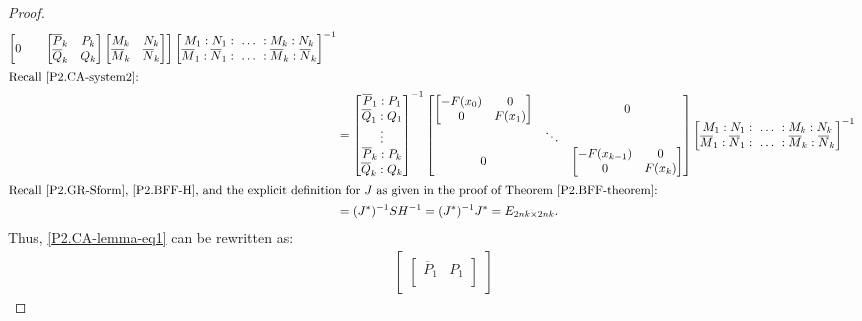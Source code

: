 \documentclass[10pt,reqno,oneside,a4paper]{article}
\begin{document}
\begin{proof}
\begin{align}
\begin{bmatrix}
0 & & \begin{bmatrix}
\overline{P}_k & P_k \\
\overline{Q}_k & Q_k 
\end{bmatrix} 
\begin{bmatrix}
M_k & N_k  \\
\overline{M}_k & \overline{N}_k 
\end{bmatrix}
\end{bmatrix}
\begin{bmatrix}
M_1 : N_1 :~ \ldots ~: M_k : N_k \\
\overline{M}_1 : \overline{N}_1 :~ \ldots ~: \overline{M}_k : \overline{N}_k 
\end{bmatrix}^{-1} \nonumber \\
\intertext{Recall \eqref{P2.CA-system2}:}
&= \begin{bmatrix}
\overline{P}_1 : P_1 \\
\overline{Q}_1 : Q_1 \\
\vdots \\
\overline{P}_k : P_k \\
\overline{Q}_k : Q_k 
\end{bmatrix}^{-1}
\begin{bmatrix}
\begin{bmatrix}
-F(x_0) & 0 \\
0 & F(x_1) 
\end{bmatrix} & & 0 \\
& \ddots & \\
0 & & \begin{bmatrix}
-F(x_{k-1}) & 0 \\
0 & F(x_k) 
\end{bmatrix}
\end{bmatrix}
\begin{bmatrix}
M_1 : N_1 :~ \ldots ~: M_k : N_k \\
\overline{M}_1 : \overline{N}_1 :~ \ldots ~: \overline{M}_k : \overline{N}_k 
\end{bmatrix}^{-1}  \nonumber \\
\intertext{Recall \eqref{P2.GR-Sform}, \eqref{P2.BFF-H}, and the explicit definition for $J$ as given in the proof of Theorem \ref{P2.BFF-theorem}:}
&= (J^*)^{-1} SH^{-1} =  (J^*)^{-1}J^* = E_{2nk \times 2nk}. \nonumber
\end{align}
Thus, \eqref{P2.CA-lemma-eq1} can be rewritten as:
\begin{align*}
&\begin{bmatrix}
\begin{bmatrix}
\overline{P}_1 & P_1 \\

\end{bmatrix}
\end{bmatrix}
\end{align*}
\end{proof}
\end{document}

